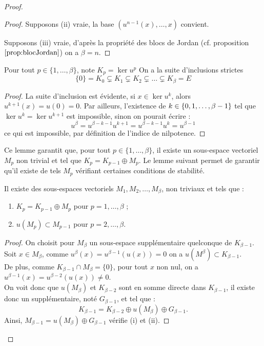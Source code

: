 \documentclass{article}
\begin{document}
\begin{proof}
\begin{proof}
Supposons (ii) vraie, la base $(u^{n-1}(x), \dots, x)$ convient. \newline

Supposons (iii) vraie, d'après la propriété des blocs de Jordan (cf. proposition $\ref{prop:blocJordan}$) on a $\beta=n$.
\end{proof}

\begin{lem}
Pour tout $p \in \{1, \dots, \beta\}$, note $K_p = \ker{u^p}$ On a la suite d'inclusions strictes
\[ \{0\} = K_0 \subsetneq K_1 \subsetneq K_2 \subsetneq \dots \subsetneq K_{\beta} = E \]
\end{lem}

\begin{proof}
La suite d'inclusion est évidente, si $x \in \ker{u^k}$, alors $u^{k+1}(x) = u(0) = 0$. 
Par ailleurs, l'existence de $k \in \{ 0, 1, \dots, \beta-1 \}$ tel que $\ker{u^k} = \ker{u^{k+1}}$ est impossible,
sinon on pourait écrire : 
\[ u^{\beta} = u^{\beta - k-1} u^{k+1} = u^{\beta - k-1} u^{k} = u^{\beta -1} \]
ce qui est impossible, par définition de l'indice de nilpotence.
\end{proof}

Ce lemme garantit que, pour tout $p \in \{1, \dots, \beta\}$, il existe un sous-espace vectoriel $M_p$ non trivial et tel que
$K_p = K_{p-1} \oplus M_p$. Le lemme suivant permet de garantir qu'il existe de tels $M_p$ vérifiant certaines conditions de stabilité.

\begin{lem}
Il existe des sous-espaces vectoriels $M_1, M_2, \dots, M_{\beta}$, non triviaux et tels que :

\begin{enumerate}[label=(\roman*)]
\item $K_p =K_{p-1} \oplus M_p$ pour $p = 1, \dots, \beta$ ;
\item $u(M_p) \subset M_{p-1}$ pour $p = 2, \dots, \beta$.
\end{enumerate}
\end{lem}

\begin{proof}
On choisit pour $M_{\beta}$ un sous-espace supplémentaire quelconque de $K_{\beta-1}$. \\
Soit $x \in M_{\beta}$, comme $u^{\beta}(x) = u^{\beta-1}(u(x)) = 0$ on a $u(M^{\beta}) \subset K_{\beta-1}$. \\
De plus, comme $K_{\beta-1} \cap M_{\beta} = \{0\}$, pour tout $x$ non nul, on a $u^{\beta-1}(x) = u^{\beta-2}(u(x)) \neq 0$. \\
On voit donc que $u(M_{\beta})$ et $K_{\beta-2}$ sont en somme directe dans $K_{\beta-1}$,
il existe donc un supplémentaire, noté $G_{\beta-1}$, et tel que :
\[ K_{\beta-1} = K_{\beta-2} \oplus u(M_{\beta}) \oplus G_{\beta-1} . \]
Ainsi, $M_{\beta-1} = u(M_{\beta}) \oplus G_{\beta-1}$ vérifie (i) et (ii). \newline


\end{proof}
\end{proof}
\end{document}
